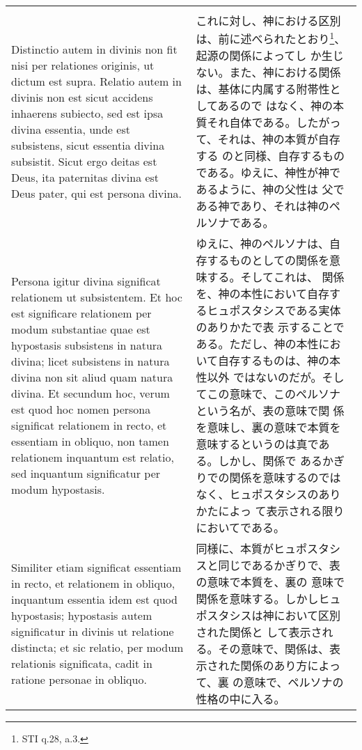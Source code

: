 \documentclass[10pt]{jsarticle} %
\begin{document}
\begin{longtable}{p{21em}p{21em}}
&

\\


Distinctio autem in divinis
non fit nisi per relationes originis, ut dictum est supra. Relatio autem
in divinis non est sicut accidens inhaerens subiecto, sed est ipsa
divina essentia, unde est subsistens, sicut essentia divina
subsistit. Sicut ergo deitas est Deus, ita paternitas divina est Deus
pater, qui est persona divina. 


&

これに対し、神における区別は、前に述べられたとおり\footnote{STI q.28, a.3.}、起源の関係によってし
 か生じない。また、神における関係は、基体に内属する附帯性としてあるので
 はなく、神の本質それ自体である。したがって、それは、神の本質が自存する
 のと同様、自存するものである。ゆえに、神性が神であるように、神の父性は
 父である神であり、それは神のペルソナである。


\\


Persona igitur divina significat
relationem ut subsistentem. Et hoc est significare relationem per modum
substantiae quae est hypostasis subsistens in natura divina; licet
subsistens in natura divina non sit aliud quam natura divina. Et
secundum hoc, verum est quod hoc nomen persona significat relationem in
recto, et essentiam in obliquo, non tamen relationem inquantum est
relatio, sed inquantum significatur per modum hypostasis. 


&

ゆえに、神のペルソナは、自存するものとしての関係を意味する。そしてこれは、
 関係を、神の本性において自存するヒュポスタシスである実体のありかたで表
 示することである。ただし、神の本性において自存するものは、神の本性以外
 ではないのだが。そしてこの意味で、このペルソナという名が、表の意味で関
 係を意味し、裏の意味で本質を意味するというのは真である。しかし、関係で
 あるかぎりでの関係を意味するのではなく、ヒュポスタシスのありかたによっ
 て表示される限りにおいてである。


\\


Similiter
etiam significat essentiam in recto, et relationem in obliquo, inquantum
essentia idem est quod hypostasis; hypostasis autem significatur in
divinis ut relatione distincta; et sic relatio, per modum relationis
significata, cadit in ratione personae in obliquo. 


&


同様に、本質がヒュポスタシスと同じであるかぎりで、表の意味で本質を、裏の
 意味で関係を意味する。しかしヒュポスタシスは神において区別された関係と
 して表示される。その意味で、関係は、表示された関係のあり方によって、裏
 の意味で、ペルソナの性格の中に入る。



\end{longtable}
\end{document}
